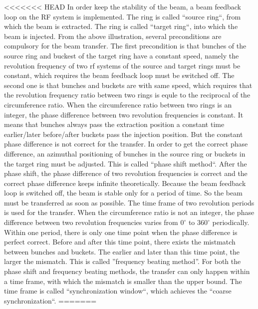 <<<<<<< HEAD
In order keep the stability of the beam, a beam feedback loop on the RF system is implemented. The ring is called ``source ring``, from which the beam is extracted. The ring is called ``target ring``, into which the beam is injected. From the above illustration, several preconditions are compulsory for the beam transfer. The first precondition is that bunches of the source ring and buckest of the target ring have a constant speed, namely the revolution frequency of two rf systems of the source and target rings must be constant, which requires the beam feedback loop must be switched off. The second one is that bunches and buckets are with same speed, which requires that the revolution frequency ratio between two rings is equle to the reciprocal of the circumference ratio. When the circumference ratio between two rings is an integer, the phase difference between two revolution frequencies is constant. It means that bunches always pass the extraction position a constant time earlier/later before/after buckets pass the injection position. But the constant phase difference is not correct for the transfer. In order to get the correct phase difference, an azimuthal positioning of bunches in the source ring or buckets in the target ring must be adjusted. This is called  ``phase shift method``. After the phase shift, the phase difference of two revolution frequencies is correct and the correct phase difference keeps infinite theoretically. Because the beam feedback loop is switched off, the beam is stable only for a period of time. So the beam must be transferred as soon as possible. The time frame of two revolution periods is used for the transfer. When the circumference ratio is not an integer, the phase difference between two revolution frequencies varies from $0^\circ$ to $360^\circ$ periodically. Within one period, there is only one time point when the phase difference is perfect correct. Before and after this time point, there exists the mistmatch between bunches and buckets. The earlier and later than this time point, the larger the mismatch. This is called ''frequency beating method''. For both the phase shift and frequency beating methods, the transfer can only happen within a time frame, with which the mismatch is smaller than the upper bound. The time frame is called ``synchronization window``, which achieves the ``coarse synchronization``.
=======
